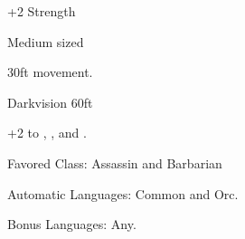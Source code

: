 
\begin{itemize*}
\item +2 Strength
\item Medium sized
\item 30ft movement.
\item Darkvision 60ft
\item +2 to , , and .
\item Favored Class: Assassin and Barbarian
\item Automatic Languages: Common and Orc.
\item Bonus Languages: Any.
\end{itemize*}
